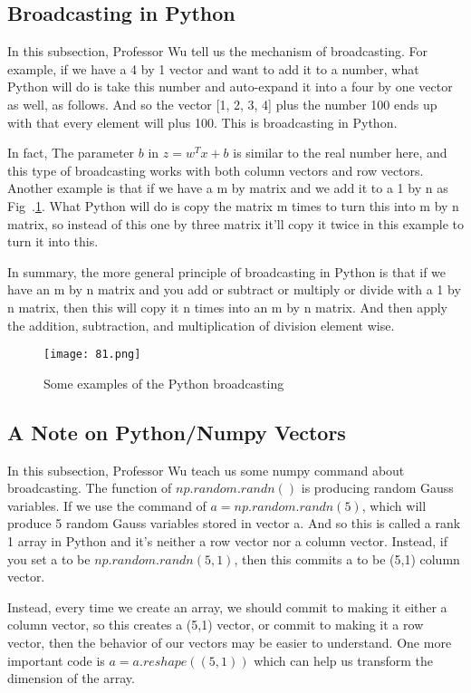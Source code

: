 \documentclass[a4paper]{article}
\begin{document}
\subsection{Broadcasting in Python}
In this subsection, Professor Wu tell us the mechanism of broadcasting. For example, if we have a 4 by 1 vector and want to add it to a number, what Python will do is take this number and auto-expand it into a four by one vector as well, as follows. And so the vector [1, 2, 3, 4] plus the number 100 ends up with that every element will plus 100. This is broadcasting in Python. 
\par
In fact, The parameter $b$ in $z=w^Tx+b$ is similar to the real number here, and this type of broadcasting works with both column vectors and row vectors. Another example is that if we have a m by matrix and we add it to a 1 by n as Fig~.\ref{4}. What Python will do is copy the matrix m times to turn this into m by n matrix, so instead of this one by three matrix it'll copy it twice in this example to turn it into this.
\par 
In summary, the more general principle of broadcasting in Python is that if we have an m by n matrix and you add or subtract or multiply or divide with a 1 by n matrix, then this will copy it n times into an m by n matrix. And then apply the addition, subtraction, and multiplication of division element wise.
 \begin{figure}[h]
\begin{center}
  \texttt{[image: 81.png]}\\
  \caption{Some examples of the Python broadcasting}\label{4}
\end{center}
\end{figure}
\subsection{A Note on Python/Numpy Vectors}
In this subsection, Professor Wu teach us some numpy command about broadcasting. The function of $np.random.randn()$ is producing random Gauss variables. If we use the command of $a=np.random.randn(5)$, which will produce 5 random Gauss variables stored in vector a. And so this is called a rank 1 array in Python and it's neither a row vector nor a column vector. Instead, if you set a to be $np.random.randn(5,1)$, then this commits a to be (5,1) column vector.
\par 
Instead, every time we create an array, we should commit to making it either a column vector, so this creates a (5,1) vector, or commit to making it a row vector, then the behavior of our vectors may be easier to understand. One more important code is $a=a.reshape((5, 1))$ which can help us transform the dimension of the array. 
\end{document}
